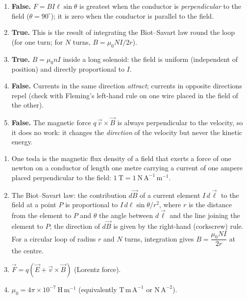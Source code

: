 \documentclass[11pt]{article}
\begin{document}
\begin{corrige}
\begin{enumerate}
\item \textbf{False.} $F = B I \ell \sin\theta$ is greatest when the conductor is \emph{perpendicular} to the field ($\theta = 90^\circ$); it is zero when the conductor is parallel to the field.
\item \textbf{True.} This is the result of integrating the Biot--Savart law round the loop (for one turn; for $N$ turns, $B = \mu_0 N I / 2r$).
\item \textbf{True.} $B = \mu_0 n I$ inside a long solenoid: the field is uniform (independent of position) and directly proportional to $I$.
\item \textbf{False.} Currents in the same direction \emph{attract}; currents in opposite directions repel (check with Fleming's left-hand rule on one wire placed in the field of the other).
\item \textbf{False.} The magnetic force $q\,\vec{v} \times \vec{B}$ is always perpendicular to the velocity, so it does no work: it changes the \emph{direction} of the velocity but never the kinetic energy.
\end{enumerate}
\end{corrige}

\begin{corrige}
\begin{enumerate}
\item One tesla is the magnetic flux density of a field that exerts a force of one newton on a conductor of length one metre carrying a current of one ampere placed perpendicular to the field: $1\ \mathrm{T} = 1\ \mathrm{N\,A^{-1}\,m^{-1}}$.
\item The Biot--Savart law: the contribution $d\vec{B}$ of a current element $I\,d\vec{\ell}$ to the field at a point $P$ is proportional to $I\,d\ell \sin\theta / r^2$, where $r$ is the distance from the element to $P$ and $\theta$ the angle between $d\vec{\ell}$ and the line joining the element to $P$; the direction of $d\vec{B}$ is given by the right-hand (corkscrew) rule. For a circular loop of radius $r$ and $N$ turns, integration gives $B = \dfrac{\mu_0 N I}{2r}$ at the centre.
\item $\vec{F} = q\left(\vec{E} + \vec{v} \times \vec{B}\right)$ (Lorentz force).
\item $\mu_0 = 4\pi \times 10^{-7}\ \mathrm{H\,m^{-1}}$ (equivalently $\mathrm{T\,m\,A^{-1}}$ or $\mathrm{N\,A^{-2}}$).
\end{enumerate}
\end{corrige}
\end{document}

